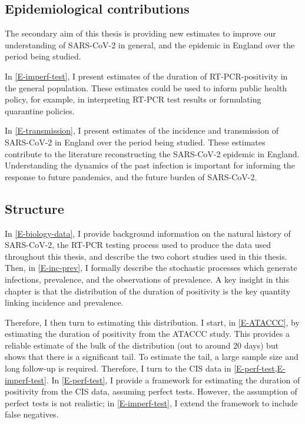 \documentclass[thesis.tex]{subfiles}
\begin{document}
\subsection{Epidemiological contributions}

The secondary aim of this thesis is providing new estimates to improve our understanding of SARS-CoV-2 in general, and the epidemic in England over the period being studied.

In \cref{E-imperf-test}, I present estimates of the duration of RT-PCR-positivity in the general population.
These estimates could be used to inform public health policy, for example, in interpreting RT-PCR test results or formulating quarantine policies.

In \cref{E-transmission}, I present estimates of the incidence and transmission of SARS-CoV-2 in England over the period being studied.
These estimates contribute to the literature reconstructing the SARS-CoV-2 epidemic in England.
Understanding the dynamics of the past infection is important for informing the response to future pandemics, and the future burden of SARS-CoV-2.

\subsection{Structure}

In \cref{E-biology-data}, I provide background information on the natural history of SARS-CoV-2, the RT-PCR testing process used to produce the data used throughout this thesis, and describe the two cohort studies used in this thesis.
Then, in \cref{E-inc-prev}, I formally describe the stochastic processes which generate infections, prevalence, and the observations of prevalence.
A key insight in this chapter is that the distribution of the duration of positivity is the key quantity linking incidence and prevalence.

Therefore, I then turn to estimating this distribution.
I start, in \cref{E-ATACCC}, by estimating the duration of positivity from the ATACCC study.
This provides a reliable estimate of the bulk of the distribution (out to around 20 days) but shows that there is a significant tail.
To estimate the tail, a large sample size and long follow-up is required.
Therefore, I turn to the CIS data in \cref{E-perf-test,E-imperf-test}.
In \cref{E-perf-test}, I provide a framework for estimating the duration of positivity from the CIS data, assuming perfect tests.
However, the assumption of perfect tests is not realistic; in \cref{E-imperf-test}, I extend the framework to include false negatives.
\end{document}
